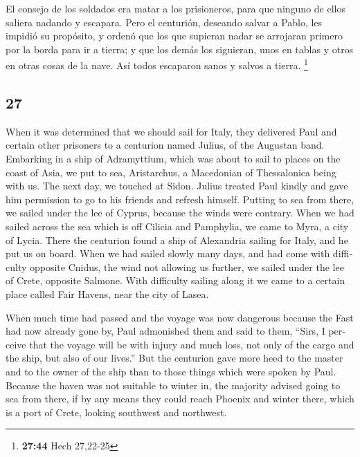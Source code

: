\begin{paracol}{2}
 El consejo de los soldados era matar a los prisioneros,
para que ninguno de ellos saliera nadando y escapara. 
Pero el centurión, deseando salvar a Pablo, les impidió su propósito, y
ordenó que los que supieran nadar se arrojaran primero por la borda para
ir a tierra;  y que los demás los siguieran, unos en
tablas y otros en otras cosas de la nave. Así todos escaparon sanos y
salvos a tierra. \footnote{\textbf{27:44} Hech 27,22-25}

\switchcolumn
\begin{otherlanguage}{english}

\hypertarget{section-53}{%
\section{27}\label{section-53}}

 When it was determined that we should sail for Italy,
they delivered Paul and certain other prisoners to a centurion named
Julius, of the Augustan band.  Embarking in a ship of
Adramyttium, which was about to sail to places on the coast of Asia, we
put to sea, Aristarchus, a Macedonian of Thessalonica being with us.
 The next day, we touched at Sidon. Julius treated Paul
kindly and gave him permission to go to his friends and refresh himself.
 Putting to sea from there, we sailed under the lee of
Cyprus, because the winds were contrary.  When we had
sailed across the sea which is off Cilicia and Pamphylia, we came to
Myra, a city of Lycia.  There the centurion found a ship
of Alexandria sailing for Italy, and he put us on board. 
When we had sailed slowly many days, and had come with difficulty
opposite Cnidus, the wind not allowing us further, we sailed under the
lee of Crete, opposite Salmone.  With difficulty sailing
along it we came to a certain place called Fair Havens, near the city of
Lasea.

 When much time had passed and the voyage was now
dangerous because the Fast had now already gone by, Paul admonished them
 and said to them, ``Sirs, I perceive that the voyage
will be with injury and much loss, not only of the cargo and the ship,
but also of our lives.''  But the centurion gave more
heed to the master and to the owner of the ship than to those things
which were spoken by Paul.  Because the haven was not
suitable to winter in, the majority advised going to sea from there, if
by any means they could reach Phoenix and winter there, which is a port
of Crete, looking southwest and northwest.


\end{otherlanguage}
\end{paracol}
